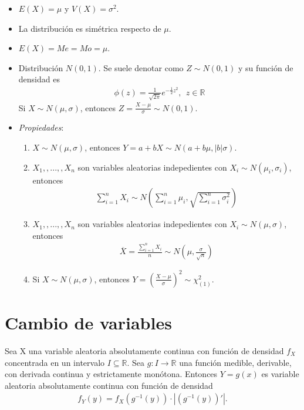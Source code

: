 \begin{itemize}
    \item $E(X) = \mu$ y $V(X) = \sigma^2$.
    \item La distribución es simétrica respecto de $\mu$.
    \item $E(X) = Me = Mo = \mu$.
    \item Distribución $N(0,1)$. Se suele denotar como $Z \sim N(0,1)$ y su función de densidad es
    \begin{align*}
        \phi(z) = \frac{1}{\sqrt{2\pi}}e^{-\frac{1}{2}z^2}, \ \ z \in \mathbb{R}
    \end{align*}
    Si $X \sim N(\mu,\sigma)$, entonces $Z = \frac{X - \mu}{\sigma} \sim N(0,1)$.
    \item \textit{Propiedades}:
    \begin{enumerate}
        \item $X \sim N(\mu,\sigma)$, entonces $Y = a + bX \sim N(a + b\mu, |b|\sigma)$.
        \item $X_1,,...,,X_n$ son variables aleatorias indepedientes con $X_i \sim N(\mu_i,\sigma_i)$, entonces
        \begin{align*}
            \sum_{i=1}^{n}{X_i} \sim N\left( \sum_{i=1}^{n}{\mu_i}, \sqrt{\sum_{i=1}^{n}{\sigma_i^2}} \right)
        \end{align*}
        \item $X_1,,...,,X_n$ son variables aleatorias indepedientes con $X_i \sim N(\mu,\sigma)$, entonces
        \begin{align*}
            \overline{X} = \frac{\sum_{i=1}^{n}{X_i}}{n} \sim N\left( \mu, \frac{\sigma}{\sqrt{n}} \right)
        \end{align*}
        \item Si $X \sim N(\mu,\sigma)$, entonces $Y = \left( \frac{X - \mu}{\sigma}\right)^2 \sim \chi_{(1)}^2$.
    \end{enumerate}
\end{itemize}

\newpage
\section{Cambio de variables}
\begin{teo}
Sea X una variable aleatoria absolutamente continua con función de densidad $f_X$ concentrada en un intervalo $I \subseteq \mathbb{R}$. Sea $g: I \longrightarrow \mathbb{R}$ una función medible, derivable, con derivada continua y estrictamente monótona. Entonces $Y = g(x)$ es variable aleatoria absolutamente continua con función de densidad
\begin{align*}
    f_Y(y) = f_X(g^{-1}(y)) \cdot |(g^{-1}(y))'|.
\end{align*}
\end{teo}

